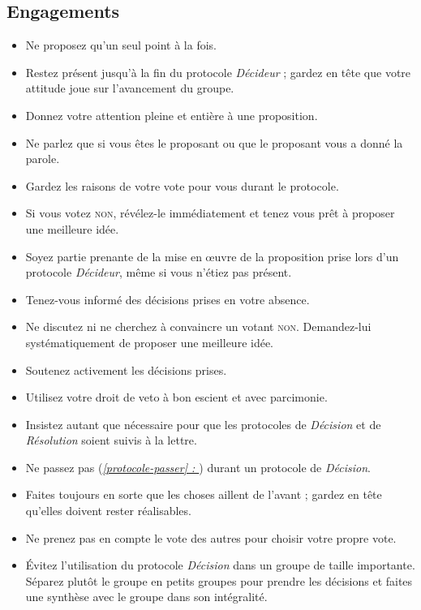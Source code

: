 \documentclass[paper=6in:9in,pagesize=pdftex,headinclude=on,footinclude=on,11pt]{scrbook}
\newcommand*{\fullref}[1]{\textit{\hyperref[{#1}]{\autoref*{#1} : \nameref*{#1}}}}
\begin{document}
\subsection{Engagements}
\begin{itemize}
	\item Ne proposez qu'un seul point à la fois.
	\item Restez présent jusqu'à la fin du protocole \emph{Décideur} ; gardez en tête que votre attitude joue sur l'avancement du groupe.
	\item Donnez votre attention pleine et entière à une proposition.
	\item Ne parlez que si vous êtes le proposant ou que le proposant vous a donné la parole.
	\item Gardez les raisons de votre vote pour vous durant le protocole.
	\item Si vous votez \textsc{non}, révélez-le immédiatement et tenez vous prêt à proposer une meilleure idée.
	\item Soyez partie prenante de la mise en œuvre de la proposition prise lors d'un protocole \emph{Décideur}, même si vous n'étiez pas présent.
	\item Tenez-vous informé des décisions prises en votre absence.
	\item Ne discutez ni ne cherchez à convaincre un votant \textsc{non}. Demandez-lui systématiquement de proposer une meilleure idée.
	\item Soutenez activement les décisions prises.
	\item Utilisez votre droit de veto à bon escient et avec parcimonie.
	\item Insistez autant que nécessaire pour que les protocoles de \emph{Décision} et de \emph{Résolution} soient suivis à la lettre.
	\item Ne passez pas (\fullref{protocole-passer}) durant un protocole de \emph{Décision}.
	\item Faites toujours en sorte que les choses aillent de l'avant ; gardez en tête qu'elles doivent rester réalisables.
	\item Ne prenez pas en compte le vote des autres pour choisir votre propre vote.
	\item Évitez l'utilisation du protocole \emph{Décision} dans un groupe de taille importante. Séparez plutôt le groupe en petits groupes pour prendre les
	      décisions et faites une synthèse avec le groupe dans son intégralité.
\end{itemize}
\end{document}
